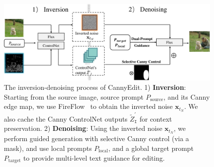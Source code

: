 \documentclass{article}
\newenvironment{cyanpar}{\color{cyan}}{}
\begin{document}
\begin{cyanpar}
\end{cyanpar}





\begin{figure}[t]
    \centering
    \includegraphics[width=0.8\linewidth]{figures/framework3.pdf}
    \vspace{-1mm}
    \caption{The inversion-denoising process of CannyEdit. 1) \textbf{Inversion}: Starting from the source image, source prompt \( P_\text{source} \), and its Canny edge map, we use FireFlow~\citep{deng2024fireflow} to obtain the inverted noise \( \mathbf{x}_{t_N} \). We also cache the Canny ControlNet outputs \( \tilde{Z}^{\prime}_{\texttt{I}} \) for context preservation. 2) \textbf{Denoising}: Using the inverted noise \( \mathbf{x}_{t_N} \), we perform guided generation with selective Canny control (via a mask), and use local prompts \( P_\text{local} \), and a global target prompt \( P_\text{target} \) to provide multi-level text guidance for editing.}
    \label{fig:framework}
\end{figure}
\end{document}
